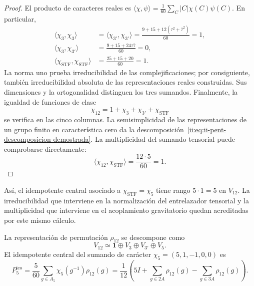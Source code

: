\begin{proof}
El producto de caracteres reales es
\(\langle\chi,\psi\rangle
=\frac1{60}\sum_C|C|\chi(C)\psi(C)\).
En particular,
\begin{align*}
 \langle\chi_3,\chi_3\rangle
 &=\langle\chi_{3'},\chi_{3'}\rangle
 =\frac{9+15+12(\tau^2+\bar\tau^2)}{60}=1,\\
 \langle\chi_3,\chi_{3'}\rangle
 &=\frac{9+15+24\tau\bar\tau}{60}=0,\\
 \langle\chi_{\mathrm{STF}},\chi_{\mathrm{STF}}\rangle
 &=\frac{25+15+20}{60}=1.
\end{align*}
La norma uno prueba irreducibilidad de las complejificaciones; por
consiguiente, también irreducibilidad absoluta de las representaciones
reales construidas. Sus dimensiones y la ortogonalidad distinguen los
tres sumandos. Finalmente, la igualdad de funciones de clase
\[
 \chi_{12}=1+\chi_3+\chi_{3'}+\chi_{\mathrm{STF}}
\]
se verifica en las cinco columnas. La semisimplicidad de las
representaciones de un grupo finito en característica cero da la
descomposición~\eqref{ii:eq:ii-pent-descomposicion-demostrada}. La
multiplicidad del sumando tensorial puede comprobarse directamente:
\[
 \langle\chi_{12},\chi_{\mathrm{STF}}\rangle
 =\frac{12\cdot5}{60}=1.
\]
\end{proof}

Así, el idempotente central asociado a
\(\chi_{\mathrm{STF}}=\chi_5\) tiene rango
\(5\cdot1=5\) en \(V_{12}\). La irreducibilidad que interviene
en la normalización del entrelazador tensorial y la multiplicidad que
interviene en el acoplamiento gravitatorio quedan acreditadas por
este mismo cálculo.



La representaci\'on de permutaci\'on \(\rho_{12}\) se descompone como
\begin{equation}
\label{ii:ii:pent:eq:gravity-v12-decomposition}
V_{12}\simeq\mathbf1\oplus V_3\oplus V_{3'}\oplus V_5.
\end{equation}
El idempotente central del sumando de car\'acter
\(\chi_5=(5,1,-1,0,0)\) es
\begin{equation}
\label{ii:ii:pent:eq:gravity-p5}
\boxed{
P^{\mathrm{ico}}_5=\frac5{60}\sum_{g\in A_5}\chi_5(g^{-1})\rho_{12}(g)
=\frac1{12}\left(
5I+\sum_{g\in2A}\rho_{12}(g)
-\sum_{g\in3A}\rho_{12}(g)
\right).}
\end{equation}

